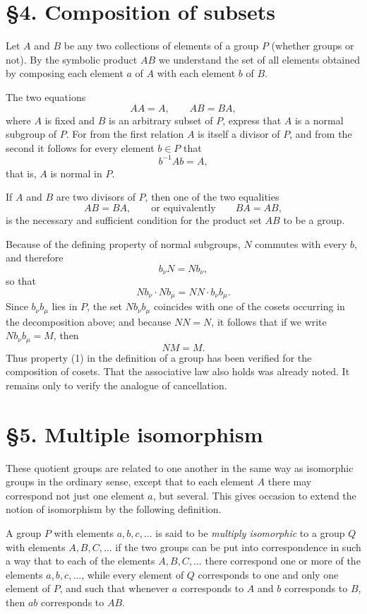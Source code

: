 \documentclass[11pt,a4paper]{book}
\begin{document}
\section*{§4. Composition of subsets}
Let $A$ and $B$ be any two collections of elements of a group $P$ (whether groups or not). By the symbolic product $AB$ we understand the set of all elements obtained by composing each element $a$ of $A$ with each element $b$ of $B$.

The two equations
\[
 AA = A,
 \qquad
 AB = BA,
\]
where $A$ is fixed and $B$ is an arbitrary subset of $P$, express that $A$ is a normal subgroup of $P$. For from the first relation $A$ is itself a divisor of $P$, and from the second it follows for every element $b\in P$ that
\[
 b^{-1} A b = A,
\]
that is, $A$ is normal in $P$.

If $A$ and $B$ are two divisors of $P$, then one of the two equalities
\[
 AB = BA,
 \qquad\text{or equivalently}\qquad
 BA = AB,
\]
is the necessary and sufficient condition for the product set $AB$ to be a group.

Because of the defining property of normal subgroups, $N$ commutes with every $b$, and therefore
\[
 b_\nu N = N b_\nu,
\]
so that
\[
 N b_\nu \cdot N b_\mu = N N \cdot b_\nu b_\mu.
\]
Since $b_\nu b_\mu$ lies in $P$, the set $N b_\nu b_\mu$ coincides with one of the cosets occurring in the decomposition above; and because $N N = N$, it follows that if we write $N b_\nu b_\mu = M$, then
\[
 N M = M.
\]
Thus property (1) in the definition of a group has been verified for the composition of cosets. That the associative law also holds was already noted. It remains only to verify the analogue of cancellation.

\section*{§5. Multiple isomorphism}
These quotient groups are related to one another in the same way as isomorphic groups in the ordinary sense, except that to each element $A$ there may correspond not just one element $a$, but several. This gives occasion to extend the notion of isomorphism by the following definition.

A group $P$ with elements $a,b,c,\dots$ is said to be \emph{multiply isomorphic} to a group $Q$ with elements $A,B,C,\dots$ if the two groups can be put into correspondence in such a way that to each of the elements $A,B,C,\dots$ there correspond one or more of the elements $a,b,c,\dots$, while every element of $Q$ corresponds to one and only one element of $P$, and such that whenever $a$ corresponds to $A$ and $b$ corresponds to $B$, then $ab$ corresponds to $AB$.
\end{document}
